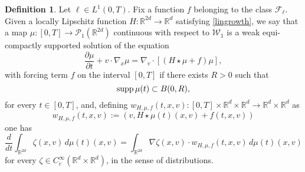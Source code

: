 \documentclass[11pt]{article}
\theoremstyle{plain}
\theoremstyle{definition}
\newtheorem{definition}[theorem]{Definition}
\theoremstyle{remark}
\numberwithin{equation}{section}
\newcommand{\R}{{\mathbb R}}
\newcommand{\PP}{{\mathcal P}_1}
\newcommand{\WW}{{\mathcal W}_1}
\begin{document}
\begin{definition}\label{defz}
Let $\ell \in L^1(0,T)$. Fix a function $f$ belonging to the class ${\mathcal F}_\ell$. Given a locally Lipschitz function $H\colon \R^{2d} \to \R^{d}$ satisfying \eqref{lingrowth}, we say that a map $\mu\colon[0,T]\to \PP(\R^{2d})$ continuous with respect to $\WW$ is a weak equi-compactly supported solution of the equation
\begin{equation}\label{PDEmodXX}
\frac{\partial \mu}{\partial t} + v \cdot \nabla_x \mu = \nabla_v \cdot \left [ \left ( H \star \mu + f \right ) \mu \right ],
\end{equation}
with forcing term $f$ on the interval $[0, T]$ if there exists $R>0$ such that
\begin{equation}\label{hypo2++}
{\rm supp }\,\mu(t)\subset B(0,R),
\end{equation}
for every $t \in [0, T]$, and, defining $w_{H, \mu, f}(t,x,v) \colon [0, T]\times \R^d \times \R^d \to \R^d\times \R^d$ as
$$
w_{H, \mu, f}(t,x,v):=(v, H\star \mu(t)(x,v)+ f(t,x,v))
$$
one has
\begin{equation}\label{solution}
\frac{d}{dt}\int_{\R^{2d}}\zeta(x,v)\,d\mu(t)(x,v)= \int_{\R^{2d}}\nabla \zeta(x,v)\cdot w_{H, \mu, f}(t,x,v)\,d\mu(t)(x,v)
\end{equation}
for every $\zeta \in C^\infty_c(\R^d \times \R^d)$, in the sense of distributions.
\end{definition}
\end{document}
